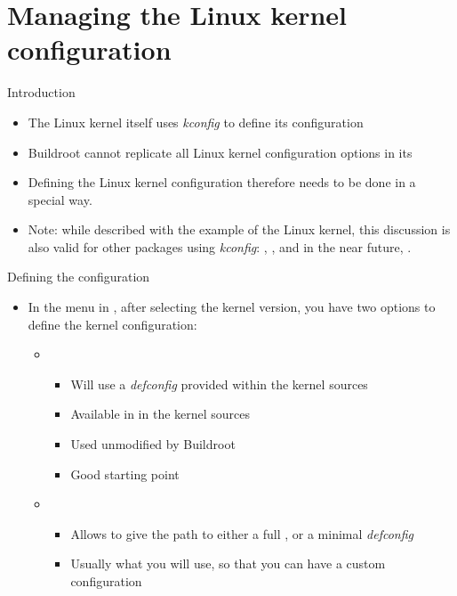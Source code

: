 \section{Managing the Linux kernel configuration}

\begin{frame}{Introduction}
  \begin{itemize}
  \item The Linux kernel itself uses {\em kconfig} to define its
    configuration
  \item Buildroot cannot replicate all Linux kernel configuration
    options in its 
  \item Defining the Linux kernel configuration therefore needs to be
    done in a special way.
  \item Note: while described with the example of the Linux kernel,
    this discussion is also valid for other packages using {\em
      kconfig}: , ,  and in
    the near future, .
  \end{itemize}
\end{frame}

\begin{frame}{Defining the configuration}
  \begin{itemize}
  \item In the  menu in , after
    selecting the kernel version, you have two options to define the
    kernel configuration:
    \begin{itemize}
    \item {}
      \begin{itemize}
      \item Will use a {\em defconfig} provided within the kernel
        sources
      \item Available in  in the kernel
        sources
      \item Used unmodified by Buildroot
      \item Good starting point
      \end{itemize}
    \item {}
      \begin{itemize}
      \item Allows to give the path to either a full ,
        or a minimal {\em defconfig}
      \item Usually what you will use, so that you can have a custom
        configuration
      \end{itemize}
    \end{itemize}
  \end{itemize}
\end{frame}

